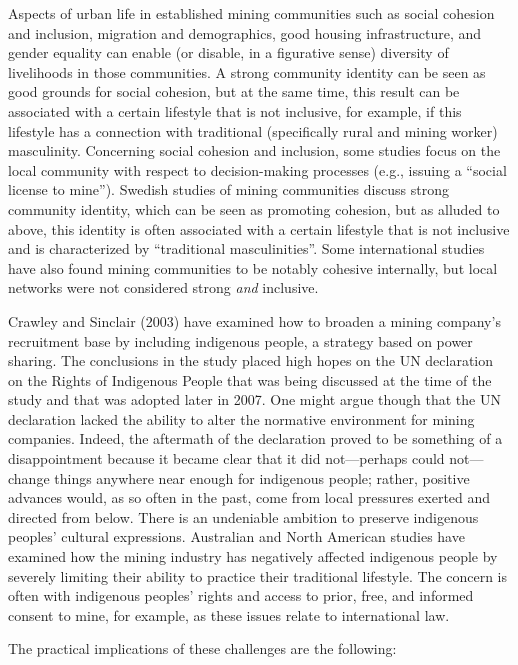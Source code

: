 \documentclass[
  12pt,
]{scrbook}
\begin{document}
Aspects of urban life in established mining communities such as social cohesion and inclusion, migration and demographics, good housing infrastructure, and gender equality can enable (or disable, in a figurative sense) diversity of livelihoods in those communities. A strong community identity can be seen as good grounds for social cohesion, but at the same time, this result can be associated with a certain lifestyle that is not inclusive, for example, if this lifestyle has a connection with traditional (specifically rural and mining worker) masculinity. Concerning social cohesion and inclusion, some studies focus on the local community with respect to decision-making processes (e.g., issuing a ``social license to mine''). Swedish studies of mining communities discuss strong community identity, which can be seen as promoting cohesion, but as alluded to above, this identity is often associated with a certain lifestyle that is not inclusive and is characterized by ``traditional masculinities''. Some international studies have also found mining communities to be notably cohesive internally, but local networks were not considered strong \emph{and} inclusive.

Crawley and Sinclair (2003) have examined how to broaden a mining company's recruitment base by including indigenous people, a strategy based on power sharing. The conclusions in the study placed high hopes on the UN declaration on the Rights of Indigenous People that was being discussed at the time of the study and that was adopted later in 2007. One might argue though that the UN declaration lacked the ability to alter the normative environment for mining companies. Indeed, the aftermath of the declaration proved to be something of a disappointment because it became clear that it did not---perhaps could not---change things anywhere near enough for indigenous people; rather, positive advances would, as so often in the past, come from local pressures exerted and directed from below. There is an undeniable ambition to preserve indigenous peoples' cultural expressions. Australian and North American studies have examined how the mining industry has negatively affected indigenous people by severely limiting their ability to practice their traditional lifestyle. The concern is often with indigenous peoples' rights and access to prior, free, and informed consent to mine, for example, as these issues relate to international law.

The practical implications of these challenges are the following:
\end{document}
